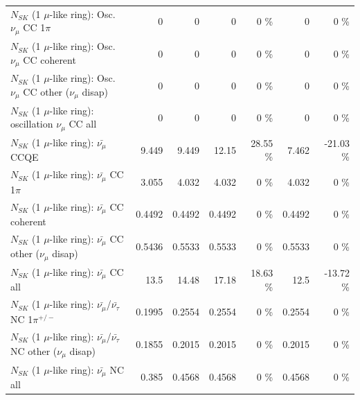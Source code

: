 \begin{table}
\begin{tabular}{| l | r | r | r  r | r  r |}
                          $N_{SK}$ (1 $\mu$-like ring): Osc. $\nu_\mu$ CC 1$\pi$ &               0 &               0 &               0 &        0 \%  &               0 &        0 \%  \\ 
                        $N_{SK}$ (1 $\mu$-like ring): Osc. $\nu_\mu$ CC coherent &               0 &               0 &               0 &        0 \%  &               0 &        0 \%  \\ 
         $N_{SK}$ (1 $\mu$-like ring): Osc. $\nu_\mu$ CC other ($\nu_\mu$ disap) &               0 &               0 &               0 &        0 \%  &               0 &        0 \%  \\ 
                      $N_{SK}$ (1 $\mu$-like ring): oscillation $\nu_\mu$ CC all &               0 &               0 &               0 &        0 \%  &               0 &        0 \%  \\ 
\hline
\hline
                              $N_{SK}$ (1 $\mu$-like ring): $\bar{\nu_\mu}$ CCQE &           9.449 &           9.449 &           12.15 &    28.55 \%  &           7.462 &   -21.03 \%  \\ 
                         $N_{SK}$ (1 $\mu$-like ring): $\bar{\nu_\mu}$ CC 1$\pi$ &           3.055 &           4.032 &           4.032 &        0 \%  &           4.032 &        0 \%  \\ 
                       $N_{SK}$ (1 $\mu$-like ring): $\bar{\nu_\mu}$ CC coherent &          0.4492 &          0.4492 &          0.4492 &        0 \%  &          0.4492 &        0 \%  \\ 
        $N_{SK}$ (1 $\mu$-like ring): $\bar{\nu_\mu}$ CC other ($\nu_\mu$ disap) &          0.5436 &          0.5533 &          0.5533 &        0 \%  &          0.5533 &        0 \%  \\ 
                          $N_{SK}$ (1 $\mu$-like ring): $\bar{\nu_{\mu}}$ CC all &            13.5 &           14.48 &           17.18 &    18.63 \%  &            12.5 &   -13.72 \%  \\ 
\hline
  $N_{SK}$ (1 $\mu$-like ring): $\bar{\nu_\mu}$/$\bar{\nu_\tau}$ NC 1$\pi^{+/-}$ &          0.1995 &          0.2554 &          0.2554 &        0 \%  &          0.2554 &        0 \%  \\ 
$N_{SK}$ (1 $\mu$-like ring): $\bar{\nu_\mu}$/$\bar{\nu_\tau}$ NC other ($\nu_\mu$ disap) &          0.1855 &          0.2015 &          0.2015 &        0 \%  &          0.2015 &        0 \%  \\ 
                          $N_{SK}$ (1 $\mu$-like ring): $\bar{\nu_{\mu}}$ NC all &           0.385 &          0.4568 &          0.4568 &        0 \%  &          0.4568 &        0 \%  \\ 

\end{tabular}
\end{table}
